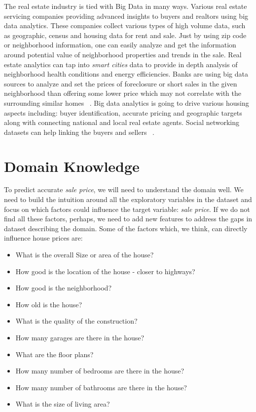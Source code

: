 \documentclass[sigconf]{acmart}
\begin{document}
    The real estate industry is tied with Big Data in many ways. Various real estate servicing companies providing advanced insights to buyers and realtors using big data analytics. These companies collect various types of high volume data, such as geographic, census and housing data for rent and sale. Just by using zip code or neighborhood information, one can easily analyze and get the information around potential value of neighborhood properties and trends in the sale. Real estate analytics can tap into {\em smart cities} data to provide in depth analysis of neighborhood health conditions and energy efficiencies. Banks are using big data sources to analyze and set the prices of foreclosure or short sales in the given neighborhood than offering some lower price which may not correlate with the surrounding similar homes ~\cite{james-2017}. Big data analytics is going to drive various housing aspects including: buyer identification, accurate pricing and geographic targets ~\cite{athena-snow-2017} along with connecting national and local real estate agents. Social networking datasets can help linking the buyers and sellers ~\cite{young-2017}. 

	\section{Domain Knowledge}
	 To predict accurate {\em sale price}, we will need to understand the domain well. We need to build the intuition around all the exploratory variables in the dataset and focus on which factors could influence the target variable: {\em sale price}. If we do not find all these factors, perhaps, we need to add new features to address the gaps in dataset describing the domain. Some of the factors which, we think, can directly influence house prices are:
	 
	 \begin{itemize}
	 	\item What is the overall Size or area of the house?
	 	\item How good is the location of the house - closer to highways?
	 	\item How good is the neighborhood?
	 	\item How old is the house?
	 	\item What is the quality of the construction?
	 	\item How many garages are there in the house?
	 	\item What are the floor plans?
	 	\item How many number of bedrooms are there in the house?
	 	\item How many number of bathrooms are there in the house?
	 	\item What is the size of living area?
	 \end{itemize}
	
\end{document}
